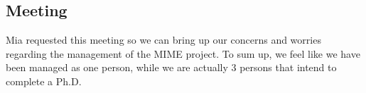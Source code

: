 \subsection{Meeting}
\label{task:20170123_cj3}


Mia requested this meeting so we can bring up our concerns and worries regarding the management of the MIME project. To sum up, we feel like we have been managed as one person, while we are actually 3 persons that intend to complete a Ph.D.




    
